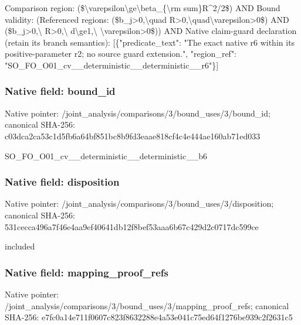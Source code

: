 \documentclass[10pt,a4paper]{article}
\begin{document}
\begingroup\raggedright\sloppy Comparison region:\allowbreak{} (\$\textbackslash{}varepsilon\textbackslash{}ge\textbackslash{}beta\_\allowbreak{}\{\textbackslash{}rm sum\}R\textasciicircum{}2/\allowbreak{}2\$) AND Bound validity:\allowbreak{} (Referenced regions:\allowbreak{} (\$b\_\allowbreak{}j>0,\allowbreak{}\textbackslash{}quad R>0,\allowbreak{}\textbackslash{}quad\textbackslash{}varepsilon>0\$) AND (\$b\_\allowbreak{}j>0,\allowbreak{}\textbackslash{} R>0,\allowbreak{}\textbackslash{} d\textbackslash{}ge1,\allowbreak{}\textbackslash{} \textbackslash{}varepsilon>0\$)) AND Native claim-guard declaration (retain its branch semantics):\allowbreak{} [\{"predicate\_\allowbreak{}text":\allowbreak{} "The exact native r6 within its positive-parameter r2;\allowbreak{} no source guard extension.",\allowbreak{} "region\_\allowbreak{}ref":\allowbreak{} "SO\_\allowbreak{}FO\_\allowbreak{}O01\_\allowbreak{}cv\_\allowbreak{}\_\allowbreak{}deterministic\_\allowbreak{}\_\allowbreak{}deterministic\_\allowbreak{}\_\allowbreak{}r6"\}]\par\endgroup

\subsubsection{Native field: bound\_\allowbreak{}id}
Native pointer: /joint\_\allowbreak{}analysis/comparisons/3/bound\_\allowbreak{}uses/3/bound\_\allowbreak{}id; canonical SHA-256: c03dca2ca53c1d5fb6a64bf851bc8b9fd3eaae818cf4c4e444ae160ab71ed033

\begingroup\raggedright\sloppy SO\_\allowbreak{}FO\_\allowbreak{}O01\_\allowbreak{}cv\_\allowbreak{}\_\allowbreak{}deterministic\_\allowbreak{}\_\allowbreak{}deterministic\_\allowbreak{}\_\allowbreak{}b6\par\endgroup

\subsubsection{Native field: disposition}
Native pointer: /joint\_\allowbreak{}analysis/comparisons/3/bound\_\allowbreak{}uses/3/disposition; canonical SHA-256: 531cecca496a7f46e4aa9ef40641db12f8bef53aaa6b67c429d2c0717dc599ce

\begingroup\raggedright\sloppy included\par\endgroup

\subsubsection{Native field: mapping\_\allowbreak{}proof\_\allowbreak{}refs}
Native pointer: /joint\_\allowbreak{}analysis/comparisons/3/bound\_\allowbreak{}uses/3/mapping\_\allowbreak{}proof\_\allowbreak{}refs; canonical SHA-256: e7fc0a14e711f0607c823f8632288e4a53e041c75ed64f1276be939c2f2631c5
\end{document}
